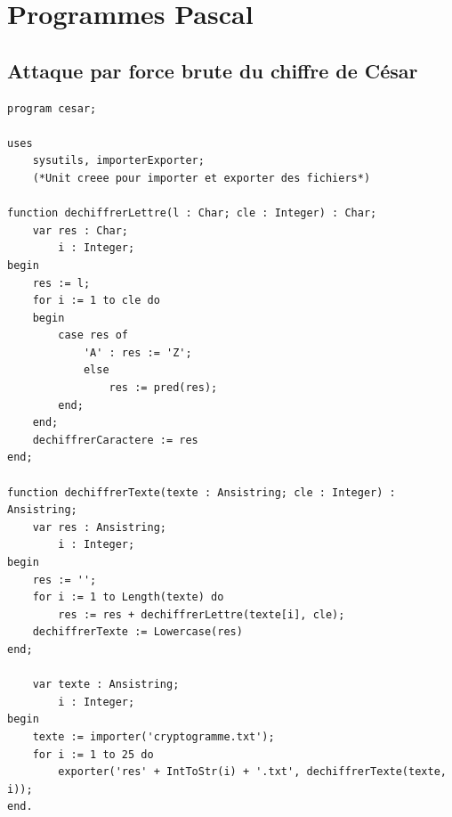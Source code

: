 \documentclass[a4paper, titlepage]{livret}
\begin{document}
\chapter{Programmes Pascal}

\lstset{language=Pascal} 

\section{Attaque par force brute du chiffre de César}

\begin{lstlisting}
program cesar;

uses 
	sysutils, importerExporter; 
	(*Unit creee pour importer et exporter des fichiers*)

function dechiffrerLettre(l : Char; cle : Integer) : Char;	
	var res : Char;
		i : Integer;
begin
	res := l;
	for i := 1 to cle do
	begin
		case res of
			'A' : res := 'Z';
			else 
				res := pred(res);
		end;
	end;
	dechiffrerCaractere := res
end;

function dechiffrerTexte(texte : Ansistring; cle : Integer) : Ansistring;
	var res : Ansistring;
		i : Integer;
begin
	res := '';
	for i := 1 to Length(texte) do
		res := res + dechiffrerLettre(texte[i], cle);
	dechiffrerTexte := Lowercase(res)
end;

	var texte : Ansistring;
		i : Integer;
begin
	texte := importer('cryptogramme.txt');
	for i := 1 to 25 do
		exporter('res' + IntToStr(i) + '.txt', dechiffrerTexte(texte, i));
end.
\end{lstlisting}
\newpage
\end{document}

